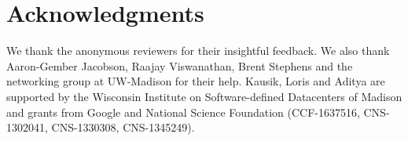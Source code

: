 \section*{Acknowledgments}
We thank the anonymous reviewers for their
insightful feedback. We also thank Aaron-Gember Jacobson, 
Raajay Viswanathan, Brent Stephens and the networking group at
UW-Madison for their help. 
Kausik, Loris and Aditya  
are supported by the Wisconsin Institute
on Software-defined Datacenters of Madison and 
grants from Google and National
Science Foundation (CCF-1637516, CNS-1302041, CNS-1330308, CNS-1345249).